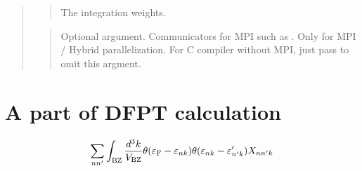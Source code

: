 \documentclass[letterpaper,10pt,pdftex,openany,english]{sphinxmanual}
\begin{document}
\begin{quote}
\begin{quote}
\sphinxAtStartPar
The integration weights.
\end{quote}

\begin{sphinxVerbatim}[commandchars=\\\{\}]
\end{sphinxVerbatim}
\begin{quote}

\sphinxAtStartPar
Optional argument. Communicators for MPI such as .
Only for MPI / Hybrid parallelization.
For C compiler without MPI, just pass  to omit this argment.
\end{quote}
\end{quote}


\section{A part of DFPT calculation}
\label{\detokenize{routine:a-part-of-dfpt-calculation}}\begin{equation*}
\begin{split}\begin{align}
\sum_{n n'}
\int_{\rm BZ} \frac{d^3 k}{V_{\rm BZ}}
\theta(\varepsilon_{\rm F} -
\varepsilon_{n k}) \theta(\varepsilon_{n k} - \varepsilon'_{n' k})
X_{n n' k}
\end{align}\end{split}
\end{equation*}
\begin{sphinxVerbatim}[commandchars=\\\{\}]
\end{sphinxVerbatim}
\end{document}
